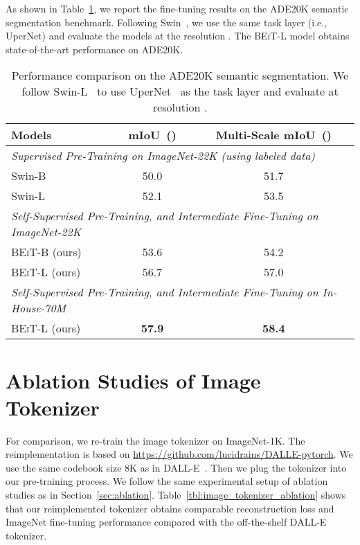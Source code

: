 \documentclass{article}
\newcommand\our{\textsc{BEiT}}
\begin{document}
As shown in Table~\ref{tbl:supervised:pt:ade20k}, we report the fine-tuning results on the ADE20K semantic segmentation benchmark.
Following Swin~\citep{swin}, we use the same task layer (i.e., UperNet) and evaluate the models at the resolution .
The \our{}-L model obtains state-of-the-art performance on ADE20K.


\begin{table}[H]
\centering
\begin{tabular}{@{}lcc}
\toprule
\bf Models & \bf mIoU~()  & \bf Multi-Scale mIoU~() \\
\midrule
\multicolumn{3}{l}{\textit{Supervised Pre-Training on ImageNet-22K (using labeled data)}} \\
Swin-B~\citep{swin} & 50.0 & 51.7 \\
Swin-L~\citep{swin} & 52.1 & 53.5 \\
\midrule
\multicolumn{3}{l}{\textit{Self-Supervised Pre-Training, and Intermediate Fine-Tuning on ImageNet-22K}} \\
\our{}-B (ours)                         & 53.6 & 54.2 \\
\our{}-L (ours)                         & 56.7 & 57.0 \\
\midrule
\multicolumn{3}{l}{\textit{Self-Supervised Pre-Training, and Intermediate Fine-Tuning on In-House-70M}} \\
\our{}-L (ours)                         & \bf 57.9 & \bf 58.4 \\
\bottomrule
\end{tabular}
\caption{
Performance comparison on the ADE20K semantic segmentation.
We follow Swin-L~\citep{swin} to use UperNet~\citep{upernet} as the task layer and evaluate at resolution .
}
\label{tbl:supervised:pt:ade20k}
\end{table}


\section{Ablation Studies of Image Tokenizer}
\label{app:tokenizer}

For comparison, we re-train the image tokenizer on ImageNet-1K.
The reimplementation is based on \url{https://github.com/lucidrains/DALLE-pytorch}.
We use the same codebook size 8K as in DALL-E~\citep{dalle}.
Then we plug the tokenizer into our pre-training process.
We follow the same experimental setup of ablation studies as in Section~\ref{sec:ablation}.
Table~\ref{tbl:image_tokenizer_ablation} shows that our reimplemented tokenizer obtains comparable reconstruction loss and ImageNet fine-tuning performance compared with the off-the-shelf DALL-E tokenizer.
\end{document}
